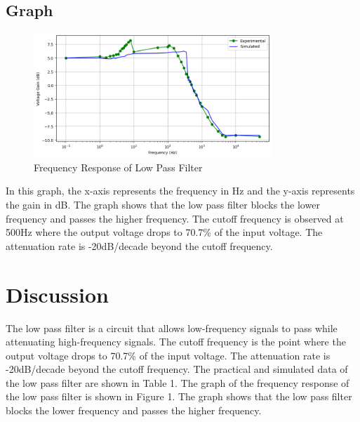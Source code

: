 \documentclass[12pt]{article}
\begin{document}
\newpage
\subsection{Graph}

\begin{figure}[h]
    \centering
    \includegraphics[width=0.8\textwidth]{LPF_Graph.png}
    \caption{Frequency Response of Low Pass Filter}
\end{figure}

In this graph, the x-axis represents the frequency in Hz and the y-axis represents the gain in dB. The graph shows that the low pass filter blocks the lower frequency and passes the higher frequency. The cutoff frequency is observed at 500Hz where the output voltage drops to 70.7\% of the input voltage. The attenuation rate is -20dB/decade beyond the cutoff frequency.

\section{Discussion}

The low pass filter is a circuit that allows low-frequency signals to pass while attenuating high-frequency signals. The cutoff frequency is the point where the output voltage drops to 70.7\% of the input voltage. The attenuation rate is -20dB/decade beyond the cutoff frequency. The practical and simulated data of the low pass filter are shown in Table 1. The graph of the frequency response of the low pass filter is shown in Figure 1. The graph shows that the low pass filter blocks the lower frequency and passes the higher frequency.
\end{document}
